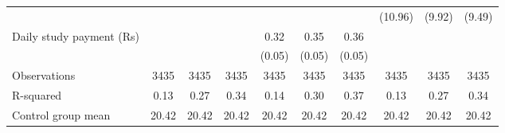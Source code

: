 \begin{tabular}{l c c c c c c c c c}
                    &            &            &            &            &            &            &     (10.96)&      (9.92)&      (9.49)\\
\addlinespace
Daily study payment (Rs)&            &            &            &        0.32&        0.35&        0.36&            &            &            \\
                    &            &            &            &      (0.05)&      (0.05)&      (0.05)&            &            &            \\
\midrule
Observations        &        3435&        3435&        3435&        3435&        3435&        3435&        3435&        3435&        3435\\
R-squared           &        0.13&        0.27&        0.34&        0.14&        0.30&        0.37&        0.13&        0.27&        0.34\\
Control group mean  &       20.42&       20.42&       20.42&       20.42&       20.42&       20.42&       20.42&       20.42&       20.42\\
\bottomrule \end{tabular} 
